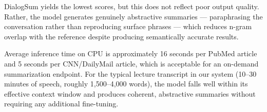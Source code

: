 DialogSum yields the lowest scores, but this does not reflect poor output quality. Rather, the model generates genuinely abstractive summaries — paraphrasing the conversation rather than reproducing surface phrases — which reduces n-gram overlap with the reference despite producing semantically accurate results.

Average inference time on CPU is approximately 16 seconds per PubMed article and 5 seconds per CNN/DailyMail article, which is acceptable for an on-demand summarization endpoint. For the typical lecture transcript in our system (10–30 minutes of speech, roughly 1,500–4,000 words), the model falls well within its effective context window and produces coherent, abstractive summaries without requiring any additional fine-tuning.
